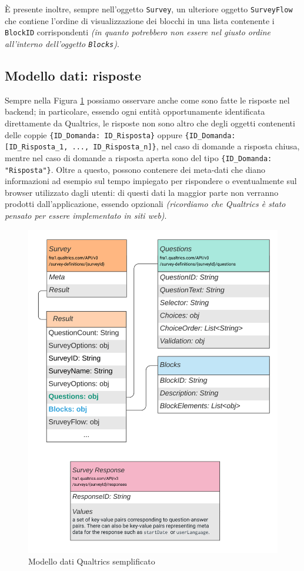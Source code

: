 È presente inoltre, sempre nell'oggetto \texttt{Survey}, un ulteriore oggetto \texttt{SurveyFlow} che contiene l'ordine di visualizzazione dei blocchi in una lista contenente i \texttt{BlockID} corrispondenti \textit{(in quanto potrebbero non essere nel giusto ordine all'interno dell'oggetto \texttt{Blocks})}.

\subsection{Modello dati: risposte}
Sempre nella Figura \ref{fig:modello_semplice_qualtrics} possiamo osservare anche come sono fatte le risposte nel backend; in particolare, essendo ogni entità opportunamente identificata direttamente da Qualtrics, le risposte non sono altro che degli oggetti contenenti delle coppie \texttt{\{ID\_Domanda: ID\_Risposta\}} oppure \texttt{\{ID\_Domanda: [ID\_Risposta\_1, ..., ID\_Risposta\_n]\}}, nel caso di domande a risposta chiusa, mentre nel caso di domande a risposta aperta sono del tipo \texttt{\{ID\_Domanda: "Risposta"\}}. Oltre a questo, possono contenere dei meta-dati che diano informazioni ad esempio sul tempo impiegato per rispondere o eventualmente sul browser utilizzato dagli utenti: di questi dati la maggior parte non verranno prodotti dall'applicazione, essendo opzionali \textit{(ricordiamo che Qualtrics è stato pensato per essere implementato in siti web)}.

\begin{figure}
\centering
\includegraphics[width=\textwidth]{img/modello_semplice_qualtrics}
\caption{Modello dati Qualtrics semplificato}
\label{fig:modello_semplice_qualtrics}
\end{figure}

